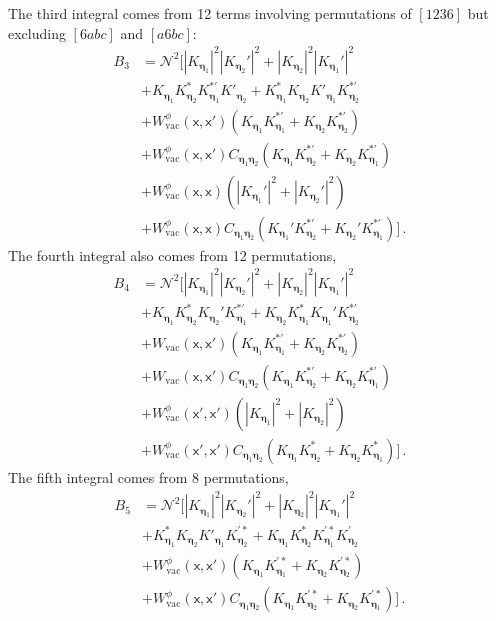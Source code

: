 \documentclass[11pt,prd,onecolumn,superscriptaddress,nofootinbib,floatfix,amsmath,amssymb]{revtex4-2}
\newcommand{\sx}{\mathsf{x}}
\newcommand{\spec}{C_{\ba\bb}}
\newcommand{\NN}{\mathcal{N}}
\newcommand{\rr}[1]{\left(#1\right)}
\newcommand{\ba}{{\bm{\eta}_1}}
\newcommand{\bb}{{\bm{\eta}_2}}
\newcommand{\vac}{\text{vac}}
\begin{document}
    The third integral comes from 12 terms involving permutations of $[1236]$ but excluding $[6abc]$ and $[a6bc]$:
    \begin{equation}
        \begin{split}
            B_3 &= {\NN}^2\bigg[|K_\ba|^2|K_\bb'|^2 + |K_\bb|^2|K_\ba'|^2 \\
            &+
            K_\ba K^*_\bb {K}^{*'}_\ba K'_\bb +  K^*_\ba K_\bb K'_\ba {K}^{*'}_\bb  \\
            &+
            W^\phi_{\vac}(\sx,\sx')\rr{K_\ba K_\ba^{*'}+K_\bb {K}^{*'}_\bb} \\
            &+
            W^\phi_{\vac}(\sx,\sx')\spec\rr{K_\ba {K}^{*'}_\bb+K_\bb K_\ba^{*'}}\\
            &+
            W_{\vac}^\phi(\sx,\sx)\left(|K_\ba'|^2+|K_\bb'|^2\right)\\
            &+             W_{\vac}^\phi(\sx,\sx)\spec\left(K_\ba'K_\bb^{*'}+K_\bb'K_\ba^{*'}\right)\bigg]\,.
        \end{split}
    \end{equation}
    The fourth integral also comes from 12 permutations,
    \begin{equation}
        \begin{split}
            B_4&= {\NN}^2\bigg[|K_\ba|^2|K_\bb'|^2 + |K_\bb|^2|K_\ba'|^2 \\
            &+ K_\ba K_\bb^* K_\bb' {K}^{*'}_\ba+K_\bb K_\ba^* K_\ba' {K}^{*'}_\bb\\
            &+
            W_{\vac}(\sx,\sx')\rr{K_\ba K_\ba^{*'}+K_\bb K_\bb^{*'}}\\
            &+
            W_{\vac}(\sx,\sx')\spec\rr{K_\ba K_\bb^{*'}+K_\bb K_\ba^{*'}}\\
            &+
            W_{\vac}^\phi(\sx',\sx')\rr{|K_\ba|^2+|K_\bb|^2}\\
            &+
            W_{\vac}^\phi(\sx',\sx')C_{\ba\bb}\rr{K_\ba K^*_\bb+K_\bb K^*_\ba}\bigg]\,.
        \end{split}
    \end{equation}
    The fifth integral comes from 8 permutations,
    \begin{equation}
    \begin{split}
        B_5 &= {\NN}^2\bigg[|K_{\ba}|^2|K_{\bb}'|^2+|K_{\bb}|^2|K_{\ba}'|^2\\
        &+ K_\ba^* K_\bb K'_\ba K^{'*}_\bb + K_\ba K^*_\bb K^{'*}_\ba K^{'}_\bb  \\
        &+ W_{\vac}^\phi(\sx,\sx')\rr{K_{\ba}K_\ba^{'*}+K_{\bb}K_\bb^{'*}}  \\
        &+ W_{\vac}^\phi(\sx,\sx')\spec\rr{K_{\ba}K_\bb^{'*}+K_{\bb}K_\ba^{'*}}\bigg] \,.
        \end{split}
    \end{equation}
\end{document}
